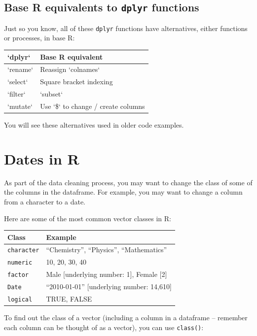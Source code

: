 \documentclass[]{book}
\makeatletter
\newenvironment{Shaded}{\begin{snugshade}}{\end{snugshade}}
\newcommand{\KeywordTok}[1]{\textcolor[rgb]{0.13,0.29,0.53}{\textbf{{#1}}}}
\newcommand{\NormalTok}[1]{{#1}}
\newenvironment{kframe}{%
\medskip{}
\setlength{\fboxsep}{.8em}
 \def\at@end@of@kframe{}%
 \ifinner\ifhmode%
  \def\at@end@of@kframe{\end{minipage}}%
  \begin{minipage}{\columnwidth}%
 \fi\fi%
 \def\FrameCommand##1{\hskip\@totalleftmargin \hskip-\fboxsep
 \colorbox{shadecolor}{##1}\hskip-\fboxsep
     \hskip-\linewidth \hskip-\@totalleftmargin \hskip\columnwidth}%
 \MakeFramed {\advance\hsize-\width
   \@totalleftmargin\z@ \linewidth\hsize
   \@setminipage}}%
 {\par\unskip\endMakeFramed%
 \at@end@of@kframe}
\renewenvironment{Shaded}{\begin{kframe}}{\end{kframe}}
\makeatother
\begin{document}
\subsection{\texorpdfstring{Base R equivalents to \texttt{dplyr}
functions}{Base R equivalents to dplyr functions}}\label{base-r-equivalents-to-dplyr-functions}

Just so you know, all of these \texttt{dplyr} functions have
alternatives, either functions or processes, in base R:

\begin{tabular}{l|l}
\hline
`dplyr` & Base R equivalent\\
\hline
`rename` & Reassign `colnames`\\
\hline
`select` & Square bracket indexing\\
\hline
`filter` & `subset`\\
\hline
`mutate` & Use `\$` to change / create columns\\
\hline
\end{tabular}

You will see these alternatives used in older code examples.

\section{Dates in R}\label{dates-in-r}

As part of the data cleaning process, you may want to change the class
of some of the columns in the dataframe. For example, you may want to
change a column from a character to a date.

Here are some of the most common vector classes in R:

\begin{longtable}[c]{@{}ll@{}}
\toprule
Class & Example\tabularnewline
\midrule
\endhead
\texttt{character} & ``Chemistry'', ``Physics'',
``Mathematics''\tabularnewline
\texttt{numeric} & 10, 20, 30, 40\tabularnewline
\texttt{factor} & Male {[}underlying number: 1{]}, Female
{[}2{]}\tabularnewline
\texttt{Date} & ``2010-01-01'' {[}underlying number:
14,610{]}\tabularnewline
\texttt{logical} & TRUE, FALSE\tabularnewline
\bottomrule
\end{longtable}

To find out the class of a vector (including a column in a dataframe --
remember each column can be thought of as a vector), you can use
\texttt{class()}:

\begin{Shaded}
\end{Shaded}
\end{document}
